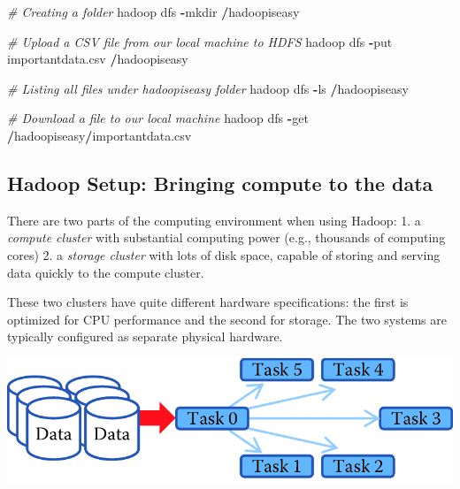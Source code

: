 \documentclass[]{krantz}
\newenvironment{Shaded}{\begin{snugshade}}{\end{snugshade}}
\newcommand{\CommentTok}[1]{\textcolor[rgb]{0.56,0.35,0.01}{\textit{#1}}}
\newcommand{\OperatorTok}[1]{\textcolor[rgb]{0.81,0.36,0.00}{\textbf{#1}}}
\newcommand{\NormalTok}[1]{#1}
\begin{document}
\begin{Shaded}
\begin{Highlighting}[]
\CommentTok{# Creating a folder}
\NormalTok{hadoop dfs }\OperatorTok{-}\NormalTok{mkdir }\OperatorTok{/}\NormalTok{hadoopiseasy}

\CommentTok{# Upload a CSV file from our local machine to HDFS}
\NormalTok{hadoop dfs }\OperatorTok{-}\NormalTok{put importantdata.csv }\OperatorTok{/}\NormalTok{hadoopiseasy}

\CommentTok{# Listing all files under hadoopiseasy folder}
\NormalTok{hadoop dfs }\OperatorTok{-}\NormalTok{ls }\OperatorTok{/}\NormalTok{hadoopiseasy}

\CommentTok{# Download a file to our local machine}
\NormalTok{hadoop dfs }\OperatorTok{-}\NormalTok{get }\OperatorTok{/}\NormalTok{hadoopiseasy}\OperatorTok{/}\NormalTok{importantdata.csv}
\end{Highlighting}
\end{Shaded}

\subsection{Hadoop Setup: Bringing compute to the
data}\label{hadoop-setup-bringing-compute-to-the-data}

There are two parts of the computing environment when using Hadoop: 1. a
\emph{compute cluster} with substantial computing power (e.g., thousands
of computing cores) 2. a \emph{storage cluster} with lots of disk space,
capable of storing and serving data quickly to the compute cluster.

These two clusters have quite different hardware specifications: the
first is optimized for CPU performance and the second for storage. The
two systems are typically configured as separate physical hardware.

\begin{center}\includegraphics[width=0.7\linewidth]{ChapterParallel/figures/data2compute} \end{center}
\end{document}
